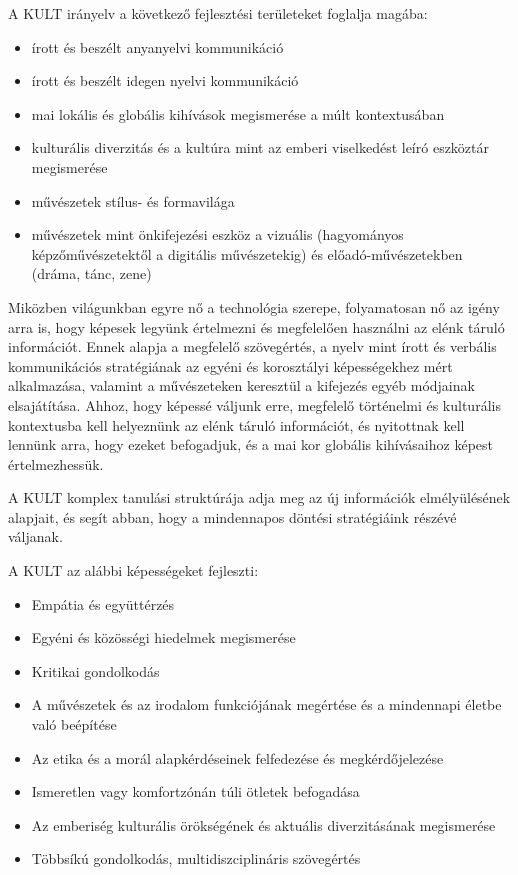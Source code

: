 A KULT irányelv a következő fejlesztési területeket foglalja magába:
\begin{itemize}
  \item írott és beszélt anyanyelvi kommunikáció

  \item írott és beszélt idegen nyelvi kommunikáció

  \item mai lokális és globális kihívások megismerése a múlt kontextusában

  \item kulturális diverzitás és a kultúra mint az emberi viselkedést leíró eszköztár megismerése

  \item művészetek stílus- és formavilága

  \item művészetek mint önkifejezési eszköz a vizuális (hagyományos képzőművészetektől a digitális művészetekig) és előadó-művé\-sze\-tek\-ben (dráma, tánc, zene)
\end{itemize}

Miközben világunkban egyre nő a technológia szerepe, folyamatosan nő az igény arra is, hogy képesek legyünk értelmezni és megfelelően használni az elénk táruló információt. Ennek alapja a megfelelő szövegértés, a nyelv mint írott és verbális kommunikációs stratégiának az egyéni és korosztályi képességekhez mért alkalmazása, valamint a művészeteken keresztül a kifejezés egyéb módjainak elsajátítása. Ahhoz, hogy képessé váljunk erre, megfelelő történelmi és kulturális kontextusba kell helyeznünk az elénk táruló információt, és nyitottnak kell lennünk arra, hogy ezeket befogadjuk, és a mai kor globális kihívásaihoz képest értelmezhessük.

A KULT komplex tanulási struktúrája adja meg az új információk elmélyülésének alapjait, és segít abban, hogy a mindennapos döntési stratégiáink részévé váljanak.

A KULT az alábbi képességeket fejleszti:
\begin{itemize}
  \item Empátia és együttérzés

  \item Egyéni és közösségi hiedelmek megismerése

  \item Kritikai gondolkodás

  \item A művészetek és az irodalom funkciójának megértése és a mindennapi életbe való beépítése

  \item Az etika és a morál alapkérdéseinek felfedezése és megkérdőjelezése

  \item Ismeretlen vagy komfortzónán túli ötletek befogadása

  \item Az emberiség kulturális örökségének és aktuális
    diverzitásának\linebreak
    megismerése

  \item Többsíkú gondolkodás, multidiszciplináris szövegértés
\end{itemize}


